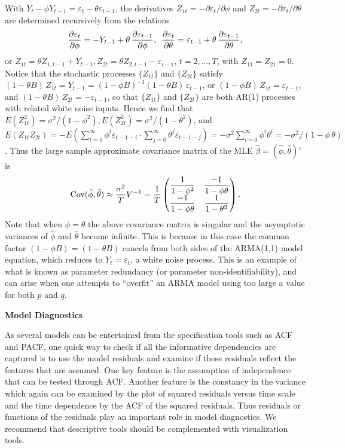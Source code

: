 \begin{ex}
 With $Y_t - \phi Y_{t-1} = \varepsilon_t - \theta\varepsilon_{t-1}$, the derivatives $Z_{1t} = -\partial\varepsilon_t/\partial\phi$ and $Z_{2t} = -\partial\varepsilon_t/\partial\theta$ are determined recursively from the relations
	\[
	\frac{\partial\varepsilon_t}{\partial\phi} = -Y_{t-1} + \theta\, \frac{\partial\varepsilon_{t-1}}{\partial\phi}, \enskip \frac{\partial\varepsilon_t}{\partial\theta} = \varepsilon_{t-1} + \theta \, \frac{\partial\varepsilon_{t-1}}{\partial\theta},
	\]
or $Z_{1t} = \theta Z_{1,t-1} + Y_{t-1}, Z_{2t} = \theta Z_{2,t-1} - \varepsilon_{i-1}$, $t= 2, \ldots, T$, with $Z_{11} = Z_{21} = 0$. Notice that the stochastic processes $\{ Z_{1t} \}$ and $\{ Z_{2t} \}$ satisfy $(1 - \theta B)\, Z_{1t} = Y_{t-1} = (1 - \phi B)^{-1} (1 - \theta B)\, \varepsilon_{t-1}$, or $(1 - \phi B)\, Z_{1t} = \varepsilon_{t-1}$, and $(1 - \theta B)\, Z_{2t} = -\varepsilon_{t-1}$, so that $\{ Z_{1t} \}$ and $\{ Z_{2t} \}$ are both AR(1) processes with related white noise inputs. Hence we find that $E(Z_{1t}^2) = \sigma^2/(1 - \phi^2), E(Z_{2t}^2) = \sigma^2/(1 - \theta^2)$, and $E(Z_{1t}Z_{2t}) = -E\left(\sum_{t=0}^\infty \phi^i \varepsilon_{t-1-i} \cdot \sum_{j=0}^\infty \theta^j \varepsilon_{t-1-j} \right) = -\sigma^2 \sum_{i=0}^\infty \phi^i \theta^i = -\sigma^2/(1 - \phi\,\theta)$. Thus the large sample approximate covariance matrix of the MLE $\hat{\beta} = (\hat{\phi},\hat{\theta})'$ is
	\[
	\operatorname{Cov}(\hat{\phi}, \hat{\theta}) \approx \frac{\sigma^2}{T} V^{-1} = \frac{1}{T} 
	\begin{pmatrix}
	\dfrac{1}{1-\phi^2} & \dfrac{-1}{1-\phi \theta} \\
	\dfrac{-1}{1-\phi \theta} & \dfrac{1}{1-\theta^2}
	\end{pmatrix}.
	\]
Note that when $\phi = \theta$ the above covariance matrix is singular and the asymptotic variances of $\hat{\phi}$ and $\hat{\theta}$ become infinite. This is because in this case the common factor $(1- \phi B) = (1 - \theta B)$ cancels from both sides of the ARMA(1,1) model equation, which reduces to $Y_t = \varepsilon_t$, a white noise process. This is an example of what is known as parameter redundancy (or parameter non-identifiability), and can arise when one attempts to ``overfit'' an ARMA model using too large a value for both $p$ and $q$. \xqed \twomedskip
\end{ex}


\noindent\textbf{Model Diagnostics} \twomedskip


As several models can be entertained from the specification tools such as ACF and PACF, one quick way to check if all the informative dependencies are captured is to use the model residuals and examine if these residuals reflect the features that are assumed. One key feature is the assumption of independence that can be tested through ACF. Another feature is the constancy in the variance which again can be examined by the plot of squared residuals versus time scale and the time dependence by the ACF of the squared residuals. Thus residuals or functions of the residuals play an important role in model diagnostics. We recommend that descriptive tools should be complemented with visualization tools. \\


